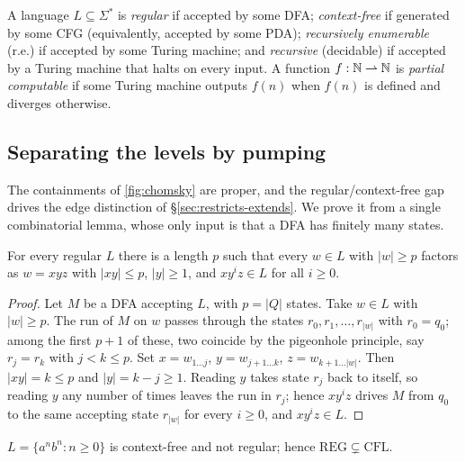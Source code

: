 A language $L \subseteq \Sigma^\ast$ is \emph{regular} if accepted by some DFA; \emph{context-free} if generated by some CFG (equivalently, accepted by some PDA); \emph{recursively enumerable} (r.e.) if accepted by some Turing machine; and \emph{recursive} (decidable) if accepted by a Turing machine that halts on every input. A function $f : \mathbb{N} \rightharpoonup \mathbb{N}$ is \emph{partial computable} if some Turing machine outputs $f(n)$ when $f(n)$ is defined and diverges otherwise.

\subsection{Separating the levels by pumping}

The containments of \cref{fig:chomsky} are proper, and the regular/context-free gap drives the edge distinction of \S\ref{sec:restricts-extends}. We prove it from a single combinatorial lemma, whose only input is that a DFA has finitely many states.

\begin{lemma}
\label{lemma:pumping}
For every regular $L$ there is a length $p$ such that every $w \in L$ with $|w| \geq p$ factors as $w = xyz$ with $|xy| \leq p$, $|y| \geq 1$, and $xy^iz \in L$ for all $i \geq 0$.
\end{lemma}

\begin{proof}
Let $M$ be a DFA accepting $L$, with $p = |Q|$ states. Take $w \in L$ with $|w| \geq p$. The run of $M$ on $w$ passes through the states $r_0, r_1, \ldots, r_{|w|}$ with $r_0 = q_0$; among the first $p+1$ of these, two coincide by the pigeonhole principle, say $r_j = r_k$ with $j < k \leq p$. Set $x = w_{1\ldots j}$, $y = w_{j+1\ldots k}$, $z = w_{k+1\ldots |w|}$. Then $|xy| = k \leq p$ and $|y| = k - j \geq 1$. Reading $y$ takes state $r_j$ back to itself, so reading $y$ any number of times leaves the run in $r_j$; hence $xy^iz$ drives $M$ from $q_0$ to the same accepting state $r_{|w|}$ for every $i \geq 0$, and $xy^iz \in L$.
\end{proof}

\begin{prop}
\label{prop:anbn}
$L = \{a^n b^n : n \geq 0\}$ is context-free and not regular; hence $\mathrm{REG} \subsetneq \mathrm{CFL}$.
\end{prop}


